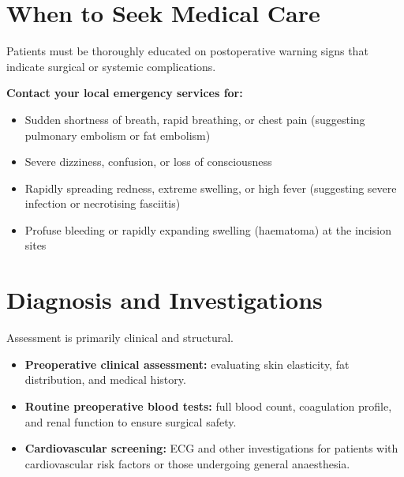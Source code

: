 \section*{When to Seek Medical Care}
Patients must be thoroughly educated on postoperative warning signs that indicate surgical or systemic complications.

\textbf{Contact your local emergency services for:}
\begin{itemize}
    \item Sudden shortness of breath, rapid breathing, or chest pain (suggesting pulmonary embolism or fat embolism)
    \item Severe dizziness, confusion, or loss of consciousness
    \item Rapidly spreading redness, extreme swelling, or high fever (suggesting severe infection or necrotising fasciitis)
    \item Profuse bleeding or rapidly expanding swelling (haematoma) at the incision sites
\end{itemize}

\section*{Diagnosis and Investigations}
Assessment is primarily clinical and structural.
\begin{itemize}
    \item \textbf{Preoperative clinical assessment:} evaluating skin elasticity, fat distribution, and medical history.
    \item \textbf{Routine preoperative blood tests:} full blood count, coagulation profile, and renal function to ensure surgical safety.
    \item \textbf{Cardiovascular screening:} ECG and other investigations for patients with cardiovascular risk factors or those undergoing general anaesthesia.
\end{itemize}

